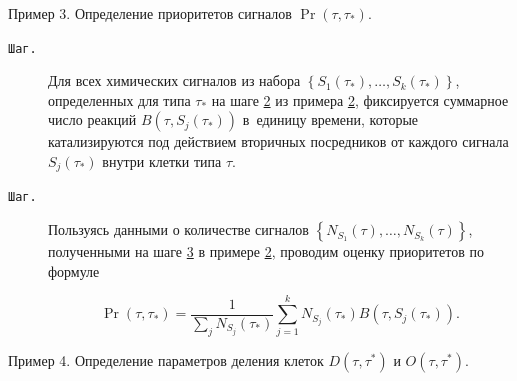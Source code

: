 \smallskip

  

{\small\sc Пример 3.} Определение приоритетов сигналов $\operatorname{Pr}(\tau,\tau_{*})$.  



\smallskip



\begin{description}





\item[\tt Шаг.\!\!] Для всех химических сигналов из набора $\left\lbrace  S_{1}(\tau_{*}), \dots , S_{k}(\tau_{*}) \right\rbrace $, определенных для типа $\tau_{*}$ на  шаге \hyperlink{naz:st:2.2}{2}  из примера \hyperlink{naz:ex:2}{2}, фиксируется суммарное число реакций $B(\tau, S_{j}(\tau_{*}))$ в~единицу времени, которые катализируются под действием вторичных посредников от каждого сигнала $ S_{j}(\tau_{*})$ внутри клетки типа $\tau$. 

 

\item[\tt Шаг.\!\!]  Пользуясь данными о количестве сигналов $\left\lbrace  N_{S_{1}}(\tau), \dots , N_{S_{k}}(\tau) \right\rbrace $, полученными на шаге \hyperlink{naz:st:2.3}{3}  в примере \hyperlink{naz:ex:2}{2}, проводим оценку приоритетов по формуле

\begin{equation} \label{nazarov:univ:Pr}  

	\operatorname{Pr}(\tau,\tau_{*}) =  

	\dfrac{1}{\sum_{j} N_{S_{j}}(\tau_{*})} \sum^{k}_{j=1}  {N_{S_{j}}(\tau_{*})} B(\tau, S_{j}(\tau_{*})).

\end{equation} 

 

\end{description}



\smallskip 

 

{\small\sc Пример 4.} Определение параметров деления клеток $D(\tau,\tau^{*})$ и $O(\tau,\tau^{*})$.



\smallskip 

 

